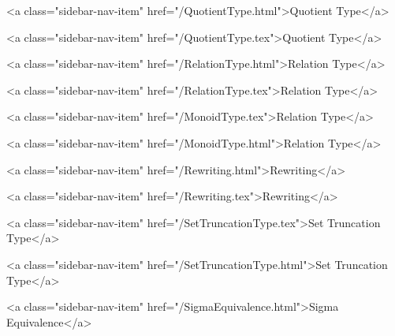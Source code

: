       
        
          <a class="sidebar-nav-item" href="/QuotientType.html">Quotient Type</a>
        
      
    
      
        
          <a class="sidebar-nav-item" href="/QuotientType.tex">Quotient Type</a>
        
      
    
      
        
          <a class="sidebar-nav-item" href="/RelationType.html">Relation Type</a>
        
      
    
      
        
          <a class="sidebar-nav-item" href="/RelationType.tex">Relation Type</a>
        
      
    
      
        
          <a class="sidebar-nav-item" href="/MonoidType.tex">Relation Type</a>
        
      
    
      
        
          <a class="sidebar-nav-item" href="/MonoidType.html">Relation Type</a>
        
      
    
      
        
          <a class="sidebar-nav-item" href="/Rewriting.html">Rewriting</a>
        
      
    
      
        
          <a class="sidebar-nav-item" href="/Rewriting.tex">Rewriting</a>
        
      
    
      
        
          <a class="sidebar-nav-item" href="/SetTruncationType.tex">Set Truncation Type</a>
        
      
    
      
        
          <a class="sidebar-nav-item" href="/SetTruncationType.html">Set Truncation Type</a>
        
      
    
      
        
          <a class="sidebar-nav-item" href="/SigmaEquivalence.html">Sigma Equivalence</a>
        
      
    
